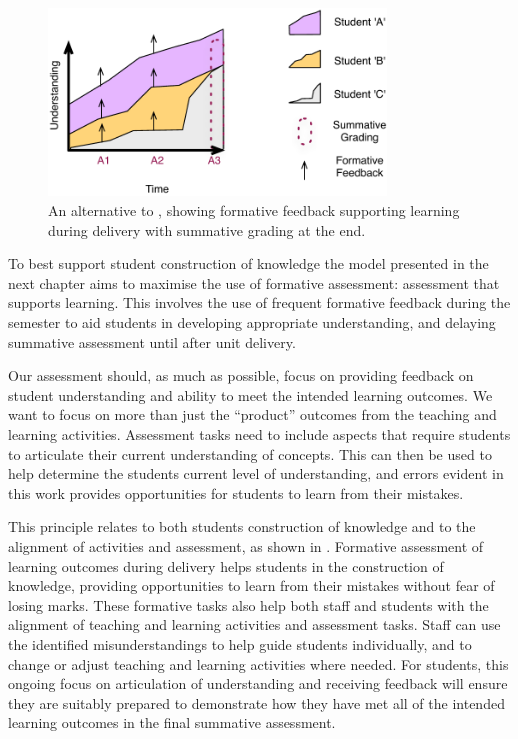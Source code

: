 \begin{figure}[htbp]
	\centering
	\includegraphics[width=0.8\textwidth]{FormativeFeedback}
	\caption{An alternative to , showing formative feedback supporting learning during delivery with summative grading at the end.}
	\label{fig:formative}
\end{figure}

To best support student construction of knowledge the model presented in the next chapter aims to maximise the use of formative assessment: assessment that supports learning. This involves the use of frequent formative feedback during the semester to aid students in developing appropriate understanding, and delaying summative assessment until after unit delivery.

Our assessment should, as much as possible, focus on providing feedback on student understanding and ability to meet the intended learning outcomes. We want to focus on more than just the ``product'' outcomes from the teaching and learning activities. Assessment tasks need to include aspects that require students to articulate their current understanding of concepts. This can then be used to help determine the students current level of understanding, and errors evident in this work provides opportunities for students to learn from their mistakes. 

This principle relates to both students construction of knowledge and to the alignment of activities and assessment, as shown in . Formative assessment of learning outcomes during delivery helps students in the construction of knowledge, providing opportunities to learn from their mistakes without fear of losing marks. These formative tasks also help both staff and students with the alignment of teaching and learning activities and assessment tasks. Staff can use the identified misunderstandings to help guide students individually, and to change or adjust teaching and learning activities where needed. For students, this ongoing focus on articulation of understanding and receiving feedback will ensure they are suitably prepared to demonstrate how they have met all of the intended learning outcomes in the final summative assessment.

